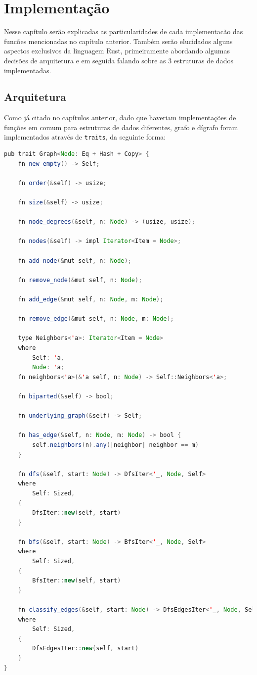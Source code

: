 \chapter{Implementação}
\label{ch:implementation}

Nesse capítulo serão explicadas as particularidades de cada implementacão das funcões mencionadas no capítulo anterior. Também serão elucidados alguns aspectos exclusivos da linguagem Rust, primeiramente abordando algumas decisões de arquitetura e em seguida falando sobre as 3 estruturas de dados implementadas.

\section{Arquitetura}

Como já citado no capítulos anterior, dado que haveriam implementações de funções em comum para estruturas de dados diferentes, grafo e dígrafo foram implementados através de \texttt{traits}, da seguinte forma:

\begin{lstlisting}[language=Java, caption={Implementação do trait Graph}, label=list:trait_graph]
pub trait Graph<Node: Eq + Hash + Copy> {
    fn new_empty() -> Self;

    fn order(&self) -> usize;

    fn size(&self) -> usize;

    fn node_degrees(&self, n: Node) -> (usize, usize);

    fn nodes(&self) -> impl Iterator<Item = Node>;

    fn add_node(&mut self, n: Node);

    fn remove_node(&mut self, n: Node);

    fn add_edge(&mut self, n: Node, m: Node);

    fn remove_edge(&mut self, n: Node, m: Node);

    type Neighbors<'a>: Iterator<Item = Node>
    where
        Self: 'a,
        Node: 'a;
    fn neighbors<'a>(&'a self, n: Node) -> Self::Neighbors<'a>;

    fn biparted(&self) -> bool;

    fn underlying_graph(&self) -> Self;

    fn has_edge(&self, n: Node, m: Node) -> bool {
        self.neighbors(n).any(|neighbor| neighbor == m)
    }

    fn dfs(&self, start: Node) -> DfsIter<'_, Node, Self>
    where
        Self: Sized,
    {
        DfsIter::new(self, start)
    }

    fn bfs(&self, start: Node) -> BfsIter<'_, Node, Self>
    where
        Self: Sized,
    {
        BfsIter::new(self, start)
    }

    fn classify_edges(&self, start: Node) -> DfsEdgesIter<'_, Node, Self>
    where
        Self: Sized,
    {
        DfsEdgesIter::new(self, start)
    }
}
\end{lstlisting}

